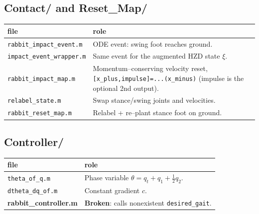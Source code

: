 \documentclass[11pt,a4paper]{article}
\newcommand{\code}[1]{\texttt{#1}}          %
\newcommand{\fname}[1]{\texttt{#1}}          %
\newcommand{\warn}[1]{\textcolor{red!70!black}{\textbf{#1}}}
\begin{document}
\subsection*{Contact/ and Reset\_Map/}
\begin{longtable}{@{}L{4.7cm} L{9.5cm}@{}}
\toprule file & role \\ \midrule \endhead
\fname{rabbit\_impact\_event.m} & ODE event: swing foot reaches ground. \\
\fname{impact\_event\_wrapper.m} & Same event for the augmented HZD state $\xi$. \\
\fname{rabbit\_impact\_map.m} & Momentum--conserving velocity reset, \code{[x\_plus,impulse]=...(x\_minus)} (impulse is the optional 2nd output). \\
\fname{relabel\_state.m} & Swap stance/swing joints and velocities. \\
\fname{rabbit\_reset\_map.m} & Relabel + re--plant stance foot on ground. \\
\bottomrule
\end{longtable}

\subsection*{Controller/}
\begin{longtable}{@{}L{4.7cm} L{9.5cm}@{}}
\toprule file & role \\ \midrule \endhead
\fname{theta\_of\_q.m} & Phase variable $\theta=q_t+q_1+\tfrac12 q_2$. \\
\fname{dtheta\_dq\_of.m} & Constant gradient $c$. \\
\warn{rabbit\_controller.m} & \warn{Broken}: calls nonexistent \code{desired\_gait}. \\
\bottomrule
\end{longtable}
\end{document}

